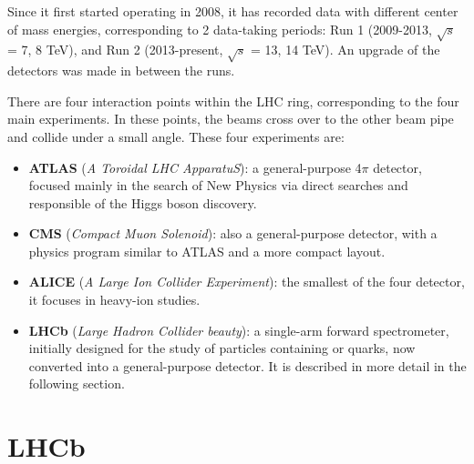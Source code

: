 Since it first started operating in 2008, it has recorded data with different center of mass energies, corresponding to 2 data-taking periods: Run 1 (2009-2013,  $\sqrt{s}$ = 7, 8 TeV), and Run 2 (2013-present, $\sqrt{s}$ = 13, 14 TeV). An upgrade of the detectors was made in between the runs. 

There are four interaction points within the LHC ring, corresponding to the four main experiments. In these points, the beams cross over to the other beam pipe and collide under a small angle. These four experiments are: 

\begin{itemize}
\item \textbf{ATLAS} (\textit{A Toroidal LHC ApparatuS}): a general-purpose 4$\pi$ detector, focused mainly in the search of New Physics via direct searches and responsible of the Higgs boson discovery.
\item \textbf{CMS} (\textit{Compact Muon Solenoid}): also a general-purpose detector, with a physics program similar to ATLAS and a more compact layout. 
\item \textbf{ALICE} (\textit{A Large Ion Collider Experiment}): the smallest of the four detector, it focuses in heavy-ion studies. 
\item \textbf{LHCb} (\textit{Large Hadron Collider beauty}): a single-arm forward spectrometer, initially designed for the study of particles containing \bquark or \cquark quarks, now converted into a general-purpose detector. It is described in more detail in the following section. 
\end{itemize}


\section{LHCb}
\label{sec:LHCb}


